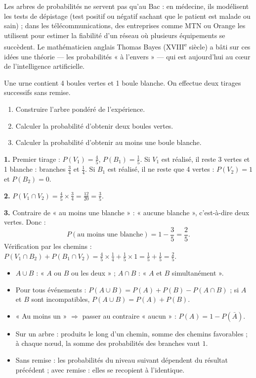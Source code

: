 \documentclass[11pt]{article}
\begin{document}
\begin{savaistu}
Les arbres de probabilités ne servent pas qu'au Bac : en médecine, ils modélisent les tests de dépistage (test positif ou négatif sachant que le patient est malade ou sain) ; dans les télécommunications, des entreprises comme MTN ou Orange les utilisent pour estimer la fiabilité d'un réseau où plusieurs équipements se succèdent. Le mathématicien anglais Thomas Bayes (XVIII\textsuperscript{e} siècle) a bâti sur ces idées une théorie — les probabilités « à l'envers » — qui est aujourd'hui au cœur de l'intelligence artificielle.
\end{savaistu}

\begin{exercice}
Une urne contient 4 boules vertes et 1 boule blanche. On effectue deux tirages successifs sans remise.
\begin{enumerate}
\item Construire l'arbre pondéré de l'expérience.
\item Calculer la probabilité d'obtenir deux boules vertes.
\item Calculer la probabilité d'obtenir au moins une boule blanche.
\end{enumerate}
\end{exercice}

\begin{corrige}[Exercice 1]
\textbf{1.} Premier tirage : $P(V_1) = \frac45$, $P(B_1) = \frac15$. Si $V_1$ est réalisé, il reste 3 vertes et 1 blanche : branches $\frac34$ et $\frac14$. Si $B_1$ est réalisé, il ne reste que 4 vertes : $P(V_2) = 1$ et $P(B_2) = 0$.

\textbf{2.} $P(V_1 \cap V_2) = \frac45 \times \frac34 = \frac{12}{20} = \frac35$.

\textbf{3.} Contraire de « au moins une blanche » : « aucune blanche », c'est-à-dire deux vertes. Donc :
\[ P(\text{au moins une blanche}) = 1 - \frac35 = \frac25. \]
Vérification par les chemins : $P(V_1 \cap B_2) + P(B_1 \cap V_2) = \frac45 \times \frac14 + \frac15 \times 1 = \frac15 + \frac15 = \frac25$.
\end{corrige}

\begin{aretenir}
\begin{itemize}
\item $A \cup B$ : « $A$ ou $B$ ou les deux » ; $A \cap B$ : « $A$ et $B$ simultanément ».
\item Pour tous événements : $P(A \cup B) = P(A) + P(B) - P(A \cap B)$ ; si $A$ et $B$ sont incompatibles, $P(A \cup B) = P(A) + P(B)$.
\item « Au moins un » $\Rightarrow$ passer au contraire « aucun » : $P(A) = 1 - P(\bar{A})$.
\item Sur un arbre : produits le long d'un chemin, somme des chemins favorables ; à chaque nœud, la somme des probabilités des branches vaut $1$.
\item Sans remise : les probabilités du niveau suivant dépendent du résultat précédent ; avec remise : elles se recopient à l'identique.
\end{itemize}
\end{aretenir}
\end{document}
